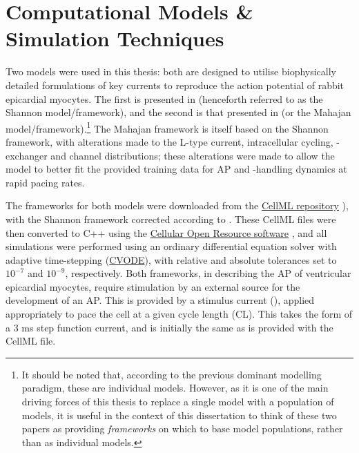 \documentclass[../thesis-main.tex]{subfiles}
\begin{document}
\section{Computational Models \& Simulation Techniques}
\label{sec:comp-models}
Two models were used in this thesis: both are designed to utilise biophysically detailed formulations of key currents to reproduce the action potential of rabbit epicardial myocytes. The first is presented in \citet{Shannon2004} (henceforth referred to as the Shannon model/framework), and the second is that presented in \citet{Mahajan2008} (or the Mahajan model/framework).\footnote{It should be noted that, according to the previous dominant modelling paradigm, these are individual models. However, as it is one of the main driving forces of this thesis to replace a single model with a population of models, it is useful in the context of this dissertation to think of these two papers as providing \emph{frameworks} on which to base model populations, rather than as individual models.} The Mahajan framework is itself based on the Shannon framework, with alterations made to the L-type \ca{} current, intra\-cellular \ca{} cycling, \na{}-\ca{} exchanger and channel distributions; these alterations were made to allow the model to better fit the provided training data for AP and \ca{}-handling dynamics at rapid pacing rates.

The frameworks for both models were downloaded from the \href{http://models.cellml.org/cellml}{CellML repository} \citep{Lloyd2008}), with the Shannon framework corrected according to \citet{Shannon2012}. These CellML files were then converted to C++ using the \href{http://cor.physiol.ox.ac.uk}{Cellular Open Resource software} \citep{Garny2003, Garny2009}, and all simulations were performed using an ordinary differential equation solver with adaptive time-stepping (\href{http://computation.llnl.gov/casc/sundials/description/description.html}{CVODE}), with relative and absolute tolerances set to $10^{-7}$ and $10^{-9}$, respectively. Both frameworks, in describing the AP of ventricular epicardial myocytes, require stimulation by an external source for the development of an AP. This is provided by a stimulus current (\istim{}), applied appropriately to pace the cell at a given cycle length (CL). This takes the form of a 3 ms step function current, and is initially the same as is provided with the CellML file.
\end{document}
